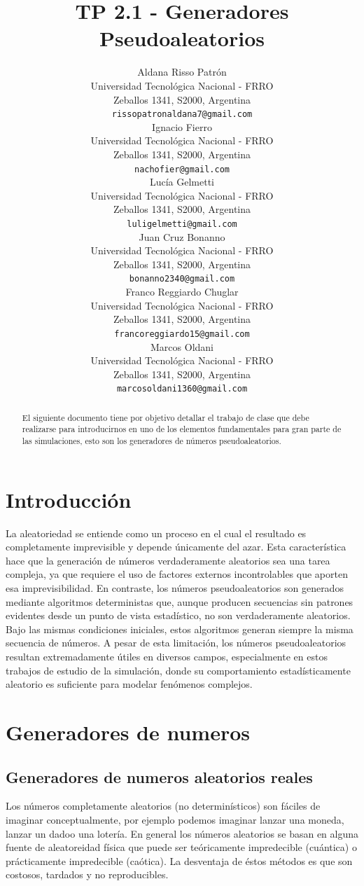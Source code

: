 \documentclass{article}
\title{TP 2.1 - Generadores Pseudoaleatorios }
\author{
 Aldana Risso Patrón \\
  Universidad Tecnológica Nacional - FRRO \\
  Zeballos 1341, S2000, Argentina \\
  \texttt{rissopatronaldana7@gmail.com} \\
   \And
 Ignacio Fierro \\
  Universidad Tecnológica Nacional - FRRO \\
  Zeballos 1341, S2000, Argentina \\
  \texttt{nachofier@gmail.com} \\
  \And
 Lucía Gelmetti \\
  Universidad Tecnológica Nacional - FRRO \\
  Zeballos 1341, S2000, Argentina \\
  \texttt{luligelmetti@gmail.com} \\
  \And
 Juan Cruz Bonanno \\
  Universidad Tecnológica Nacional - FRRO \\
  Zeballos 1341, S2000, Argentina \\
  \texttt{bonanno2340@gmail.com} \\
  \And
 Franco Reggiardo Chuglar \\
  Universidad Tecnológica Nacional - FRRO\\
  Zeballos 1341, S2000, Argentina \\
  \texttt{francoreggiardo15@gmail.com} \\
  \And
 Marcos Oldani \\
  Universidad Tecnológica Nacional - FRRO \\
  Zeballos 1341, S2000, Argentina \\
  \texttt{marcosoldani1360@gmail.com} \\
}
\begin{document}
\maketitle
\begin{abstract}
El siguiente documento tiene por objetivo detallar el trabajo de clase que debe realizarse para
introducirnos en uno de los elementos fundamentales para gran parte de las simulaciones, esto son
los generadores de números pseudoaleatorios.
\end{abstract}


\section{Introducción}
La aleatoriedad se entiende como un proceso en el cual el resultado es completamente imprevisible y depende únicamente del azar. Esta característica hace que la generación de números verdaderamente aleatorios sea una tarea compleja, ya que requiere el uso de factores externos incontrolables que aporten esa imprevisibilidad. En contraste, los números pseudoaleatorios son generados mediante algoritmos deterministas que, aunque producen secuencias sin patrones evidentes desde un punto de vista estadístico, no son verdaderamente aleatorios. Bajo las mismas condiciones iniciales, estos algoritmos generan siempre la misma secuencia de números. A pesar de esta limitación, los números pseudoaleatorios resultan extremadamente útiles en diversos campos, especialmente en estos trabajos de estudio de la simulación, donde su comportamiento estadísticamente aleatorio es suficiente para modelar fenómenos complejos.


\section{Generadores de numeros}
\subsection{Generadores de numeros aleatorios reales}

Los números completamente aleatorios (no
determinísticos) son fáciles de imaginar conceptualmente, por ejemplo podemos imaginar
lanzar una moneda, lanzar un dadoo una lotería.
En general los números aleatorios se basan en alguna fuente de aleatoreidad física que
puede ser teóricamente impredecible (cuántica) o prácticamente impredecible (caótica). 
La desventaja de éstos métodos es que son costosos, tardados y no reproducibles.
\end{document}
